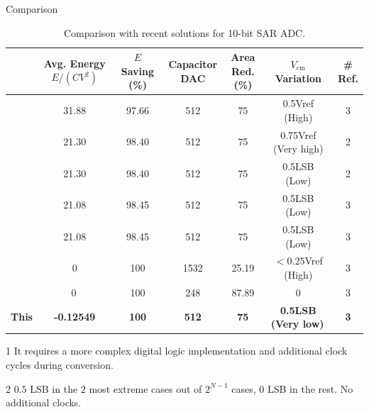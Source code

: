 \documentclass[final]{beamer}
\newlength{\colwidth}
\begin{document}
\begin{frame}[t]
\begin{columns}[t]
\begin{column}{\colwidth}
\begin{block}{Comparison}
    \vspace{0.2cm}
    \begin{table}[t] \small
    \caption{Comparison with recent solutions for 10-bit SAR ADC.}
    \begin{threeparttable}
    \centering
    \begin{tabular}{|c||c|c|c|c|c|c|} \hline
                      &\shortstack{Avg. Energy\\$E/(CV^2)$} &\shortstack{$E$ Saving\\(\%)} &\shortstack{Capacitor\\DAC} &\shortstack{Area Red.\\(\%)} &\shortstack{$V_{\text{cm}}$\\Variation} &\shortstack{\#\\Ref.}  \\ \hline
    \cite{Zhu13}      & 31.88     & 97.66       & 512         & 75          & 0.5Vref (High)       & 3\\ \hline
    \cite{Sanyal13}   & 21.30     & 98.40       & 512         & 75          & 0.75Vref (Very high)  & 2\\ \hline
    \cite{Wu17}       & 21.30     & 98.40       & 512         & 75          & 0.5LSB (Low)         & 2\\ \hline
    \cite{Li20}       & 21.08     & 98.45       & 512         & 75          & 0.5LSB (Low)         & 3\\ \hline
    \cite{Hu22}       & 21.08     & 98.45       & 512         & 75          & 0.5LSB (Low)         & 3\\ \hline
    \cite{Akbari19}   & 0         & 100         & 1532       & 25.19          & $< 0.25$Vref (High)        & 3\\ \hline
    \cite{Yousefi18}  & 0\,\tnote{1}         & 100         & 248        & 87.89 & 0               & 3\\ \hline
    \textbf{This} &\textbf{-0.12549} &\textbf{100} &\textbf{512} &\textbf{75} &\textbf{0.5LSB (Very low)}\,\tnote{2} &\textbf{3}\\ \hline
    \end{tabular}
        \begin{tablenotes}
            \item [1] \footnotesize{It requires a more complex digital logic implementation and additional clock cycles during conversion.} \\
            \item [2] \footnotesize{$0.5$ LSB in the $2$ most extreme cases out of $2^{N-1}$ cases, $0$ LSB in the rest. No additional clocks.}
        \end{tablenotes}
    \vspace{0.1cm}
    \label{tab:comp}
    \end{threeparttable}
    \end{table}



\end{block}
\end{column}
\end{columns}
\end{frame}
\end{document}
